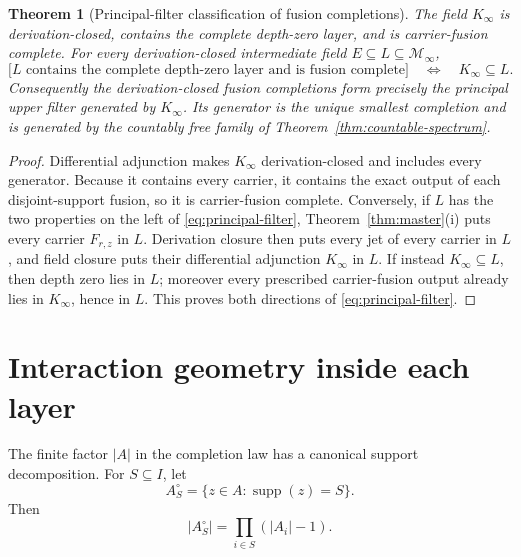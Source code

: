 \documentclass[11pt]{article}
\newtheorem{theorem}{Theorem}[section]
\theoremstyle{definition}
\theoremstyle{remark}
\newcommand{\cM}{\mathcal M}
\newcommand{\supp}{\operatorname{supp}}
\begin{document}
\begin{theorem}[Principal-filter classification of fusion completions]
\label{cor:minimal-completion}
The field \(K_\infty\) is derivation-closed, contains the complete depth-zero layer, and is
carrier-fusion complete.  For every derivation-closed intermediate field
\(E\subseteq L\subseteq\cM_\infty\),
\begin{equation}\label{eq:principal-filter}
 \bigl[L\text{ contains the complete depth-zero layer and is fusion complete}\bigr]
 \quad\Longleftrightarrow\quad K_\infty\subseteq L.
\end{equation}
Consequently the derivation-closed fusion completions form precisely the principal upper filter
generated by \(K_\infty\).  Its generator is the unique smallest completion and is generated by
the countably free family of Theorem~\ref{thm:countable-spectrum}.
\end{theorem}

\begin{proof}
Differential adjunction makes \(K_\infty\) derivation-closed and includes every generator.
Because it contains every carrier, it contains the exact output of each disjoint-support fusion,
so it is carrier-fusion complete.  Conversely, if \(L\) has the two properties on the left of
\eqref{eq:principal-filter}, Theorem~\ref{thm:master}(i) puts every carrier \(F_{r,z}\) in \(L\).
Derivation closure then puts every jet of every carrier in \(L\), and field closure puts their
differential adjunction \(K_\infty\) in \(L\).  If instead \(K_\infty\subseteq L\), then depth
zero lies in \(L\); moreover every prescribed carrier-fusion output already lies in
\(K_\infty\), hence in \(L\).  This proves both directions of \eqref{eq:principal-filter}.
\end{proof}

\section{Interaction geometry inside each layer}\label{sec:interaction}

The finite factor \(|A|\) in the completion law has a canonical support decomposition.  For
\(S\subseteq I\), let
\[
 A_S^\circ=\{z\in A:\supp(z)=S\}.
\]
Then
\begin{equation}\label{eq:support-card}
 |A_S^\circ|=\prod_{i\in S}(|A_i|-1).
\end{equation}
\end{document}
